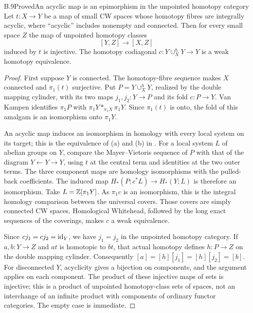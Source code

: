 \begin{claim}{B.9}{Proved}{An acyclic map is an epimorphism in the unpointed homotopy category}
Let $t:X\to Y$ be a map of small CW spaces whose homotopy
fibres are integrally acyclic, where ``acyclic'' includes
nonempty and connected. Then for every small space $Z$ the
map of unpointed homotopy classes
\[
 [Y,Z]\longrightarrow[X,Z]
 \tag{B.9.1}
\]
induced by $t$ is injective. The homotopy codiagonal
$c:Y\cup_X^hY\to Y$ is a weak homotopy equivalence.
\end{claim}
\begin{proof}
First suppose $Y$ is connected. The homotopy-fibre sequence
makes $X$ connected and $\pi_1(t)$ surjective. Put
$P=Y\cup_X^hY$, realized by the double mapping cylinder, with
its two maps $j_1,j_2:Y\to P$ and its fold $c:P\to Y$.
Van Kampen identifies $\pi_1P$ with
$\pi_1Y*_{\pi_1X}\pi_1Y$. Since $\pi_1(t)$ is onto, the
fold of this amalgam is an isomorphism onto $\pi_1Y$.

An acyclic map induces an isomorphism in homology with every
local system on its target; this is the equivalence of (a) and
(b) in \citet[Definition/Proposition~1.2]{HausmannHusemoller1979}.
For a local system $L$ of abelian groups on $Y$, compare the
Mayer--Vietoris sequence of $P$ with that of the diagram
$Y\leftarrow Y\to Y$, using $t$ at the central term and
identities at the two outer terms. The three component maps
are homology isomorphisms with the pulled-back coefficients.
The induced map $H_*(P;c^*L)\to H_*(Y;L)$ is therefore an
isomorphism. Take $L=\mathbb Z[\pi_1Y]$. As $\pi_1c$ is an
isomorphism, this is the integral homology comparison between
the universal covers. Those covers are simply connected CW
spaces. Homological Whitehead, followed by the long exact
sequences of the coverings, makes $c$ a weak equivalence.

Since $cj_1=cj_2=\mathrm{id}_Y$, we have $j_1=j_2$ in the unpointed
homotopy category. If $a,b:Y\to Z$ and $at$ is homotopic to
$bt$, that actual homotopy defines $h:P\to Z$ on the double
mapping cylinder. Consequently $[a]=[h][j_1]=[h][j_2]=[b]$.
For disconnected $Y$, acyclicity gives a bijection on
components, and the argument applies on each component.
The product of these injective maps of sets is injective;
this is a product of unpointed homotopy-class sets of spaces,
not an interchange of an infinite product with components of
ordinary functor categories. The empty case is immediate.
\end{proof}

